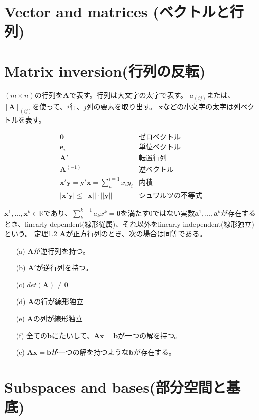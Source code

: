 \documentclass{jsarticle}
\begin{document}
\section*{Vector and matrices (ベクトルと行列)}
\section*{Matrix inversion(行列の反転)}

$(m\times n)$の行列を$\bm{A}$で表す。行列は大文字の太字で表す。
$a_(ij)$または、$[\bm{A}]_(ij)$を使って、$i$行、$j$列の要素を取り出す。
$\bm{x}$などの小文字の太字は列ベクトルを表す。

\begin{equation*}
\begin{array}{cc}
\bm{0}&\text{ゼロベクトル}\\
\bm{e}_i&\text{単位ベクトル}\\
\bm{A}'&\text{転置行列}\\
\bm{A}^(-1)&\text{逆ベクトル}\\
\bm{x}'\bm{y}=\bm{y}'\bm{x}=\sum_{n}^{i=1}x_iy_i&\text{内積}\\
|\bm{x}'\bm{y}|\leq||\bm{x}||\cdot||\bm{y}||&シュワルツの不等式
\end{array}
\end{equation*}

$\bm{x}^1,...,\bm{x}^k\in \mathbb{R}$であり、$\sum_{k}^{k=1}a_kx^k=\bm{0}$を満たす$0$ではない実数$\bm{a}^1,...,\bm{a}^k$が存在するとき、linearly dependent(線形従属)、それ以外をlinearly independent(線形独立)という。
定理1.2 $\bm{A}$が正方行列のとき、次の場合は同等である。
\begin{itemize}
\item[(a)] $\bm{A}$が逆行列を持つ。
\item[(b)] $\bm{A}'$が逆行列を持つ。
\item[(c)] $det(\bm{A})\neq0$
\item[(d)] $\bm{A}$の行が線形独立
\item[(e)] $\bm{A}$の列が線形独立
\item[(f)] 全ての$\bm{b}$にたいして、$\bm{A}\bm{x}=\bm{b}$が一つの解を持つ。
\item[(e)] $\bm{A}\bm{x}=\bm{b}$が一つの解を持つような$\bm{b}$が存在する。
\end{itemize}

\section*{Subspaces and bases(部分空間と基底)}
\end{document}
